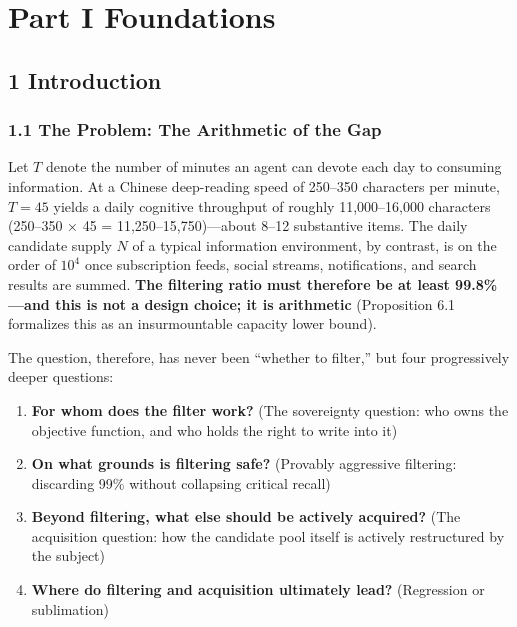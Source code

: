 \documentclass[
  11pt]{article}
\providecommand{\tightlist}{%
  \setlength{\itemsep}{0pt}\setlength{\parskip}{0pt}}
\begin{document}
\newpage
\tableofcontents
\newpage

\section{Part I Foundations}\label{part-i-foundations}

\subsection{1 Introduction}\label{introduction}

\subsubsection{1.1 The Problem: The Arithmetic of the
Gap}\label{the-problem-the-arithmetic-of-the-gap}

Let \(T\) denote the number of minutes an agent can devote each day to
consuming information. At a Chinese deep-reading speed of 250--350
characters per minute, \(T=45\) yields a daily cognitive throughput of
roughly 11,000--16,000 characters (250--350 × 45 =
11,250--15,750)---about 8--12 substantive items. The daily candidate
supply \(N\) of a typical information environment, by contrast, is on
the order of \(10^4\) once subscription feeds, social streams,
notifications, and search results are summed. \textbf{The filtering
ratio must therefore be at least 99.8\%---and this is not a design
choice; it is arithmetic} (Proposition 6.1 formalizes this as an
insurmountable capacity lower bound).

The question, therefore, has never been ``whether to filter,'' but four
progressively deeper questions:

\begin{enumerate}
\def\labelenumi{\arabic{enumi}.}
\tightlist
\item
  \textbf{For whom does the filter work?} (The sovereignty question: who
  owns the objective function, and who holds the right to write into it)
\item
  \textbf{On what grounds is filtering safe?} (Provably aggressive
  filtering: discarding 99\% without collapsing critical recall)
\item
  \textbf{Beyond filtering, what else should be actively acquired?} (The
  acquisition question: how the candidate pool itself is actively
  restructured by the subject)
\item
  \textbf{Where do filtering and acquisition ultimately lead?}
  (Regression or sublimation)
\end{enumerate}
\end{document}
